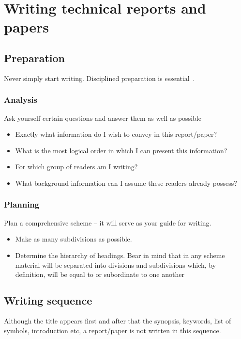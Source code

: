 \documentclass[a4paper,12pt]{article}
\begin{document}
\section{Writing technical reports and papers}
\label{cha:writing-reports}

\subsection{Preparation}
Never simply start writing.  Disciplined preparation is
essential~\cite{johnson}.

\subsubsection{Analysis}

Ask yourself certain questions and answer them as well as possible

\begin{itemize}
\item Exactly what information do I wish to convey in this
  report/paper?
\item What is the most logical order in which I can present this
  information?
\item For which group of readers am I writing?
\item What background information can I assume these readers already
  possess?
\end{itemize}

\subsubsection{Planning}
Plan a comprehensive scheme -- it will serve as your guide for
writing.

\begin{itemize}
\item Make as many subdivisions as possible.
\item Determine the hierarchy of headings.  Bear in mind that in any
  scheme material will be separated into divisions and subdivisions
  which, by definition, will be equal to or subordinate to one another
\end{itemize}

\subsection{Writing sequence}
Although the title appears first and after that the synopsis,
keywords, list of symbols, introduction etc, a report/paper is not
written in this sequence.
\end{document}
